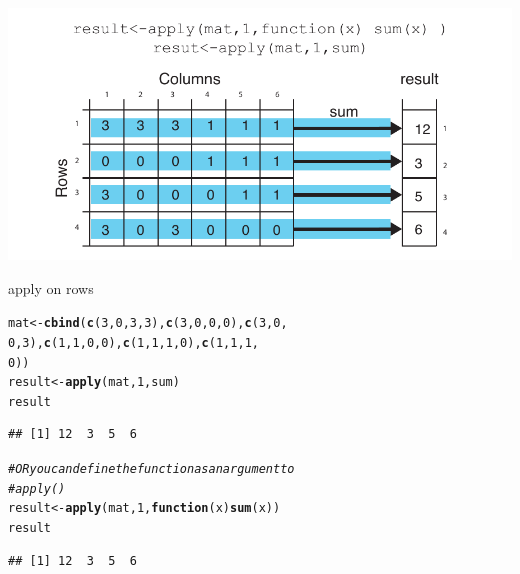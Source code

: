 \documentclass[english,nohyper]{tufte-book}\usepackage[]{graphicx}\usepackage[]{color}
\makeatletter
\newcommand{\hlnum}[1]{\textcolor[rgb]{0.686,0.059,0.569}{#1}}%
\newcommand{\hlcom}[1]{\textcolor[rgb]{0.678,0.584,0.686}{\textit{#1}}}%
\newcommand{\hlstd}[1]{\textcolor[rgb]{0.345,0.345,0.345}{#1}}%
\newcommand{\hlkwa}[1]{\textcolor[rgb]{0.161,0.373,0.58}{\textbf{#1}}}%
\newcommand{\hlkwb}[1]{\textcolor[rgb]{0.69,0.353,0.396}{#1}}%
\newcommand{\hlkwc}[1]{\textcolor[rgb]{0.333,0.667,0.333}{#1}}%
\newcommand{\hlkwd}[1]{\textcolor[rgb]{0.737,0.353,0.396}{\textbf{#1}}}%
\newenvironment{kframe}{%
 \def\at@end@of@kframe{}%
 \ifinner\ifhmode%
  \def\at@end@of@kframe{\end{minipage}}%
  \begin{minipage}{\columnwidth}%
 \fi\fi%
 \def\FrameCommand##1{\hskip\@totalleftmargin \hskip-\fboxsep
 \colorbox{shadecolor}{##1}\hskip-\fboxsep
     \hskip-\linewidth \hskip-\@totalleftmargin \hskip\columnwidth}%
 \MakeFramed {\advance\hsize-\width
   \@totalleftmargin\z@ \linewidth\hsize
   \@setminipage}}%
 {\par\unskip\endMakeFramed%
 \at@end@of@kframe}
\newenvironment{knitrout}{}{} %
\makeatother
\begin{document}
\begin{marginfigure}
\includegraphics[clip,scale=0.5]{1_Users_altuna_Dropbox_PAPERS_R-devel_compgenr_chapters_nonR_figures_apply.pdf}\caption{apply on rows\label{mar:apply-on-a-matrix}}


\end{marginfigure}


\begin{knitrout}
\color{fgcolor}\begin{kframe}
\begin{alltt}
\hlstd{mat} \hlkwb{<-} \hlkwd{cbind}\hlstd{(}\hlkwd{c}\hlstd{(}\hlnum{3}\hlstd{,} \hlnum{0}\hlstd{,} \hlnum{3}\hlstd{,} \hlnum{3}\hlstd{),} \hlkwd{c}\hlstd{(}\hlnum{3}\hlstd{,} \hlnum{0}\hlstd{,} \hlnum{0}\hlstd{,} \hlnum{0}\hlstd{),} \hlkwd{c}\hlstd{(}\hlnum{3}\hlstd{,} \hlnum{0}\hlstd{,}
    \hlnum{0}\hlstd{,} \hlnum{3}\hlstd{),} \hlkwd{c}\hlstd{(}\hlnum{1}\hlstd{,} \hlnum{1}\hlstd{,} \hlnum{0}\hlstd{,} \hlnum{0}\hlstd{),} \hlkwd{c}\hlstd{(}\hlnum{1}\hlstd{,} \hlnum{1}\hlstd{,} \hlnum{1}\hlstd{,} \hlnum{0}\hlstd{),} \hlkwd{c}\hlstd{(}\hlnum{1}\hlstd{,} \hlnum{1}\hlstd{,} \hlnum{1}\hlstd{,}
    \hlnum{0}\hlstd{))}
\hlstd{result} \hlkwb{<-} \hlkwd{apply}\hlstd{(mat,} \hlnum{1}\hlstd{, sum)}
\hlstd{result}
\end{alltt}
\begin{verbatim}
## [1] 12  3  5  6
\end{verbatim}
\begin{alltt}
\hlcom{# OR you can define the function as an argument to}
\hlcom{# apply()}
\hlstd{result} \hlkwb{<-} \hlkwd{apply}\hlstd{(mat,} \hlnum{1}\hlstd{,} \hlkwa{function}\hlstd{(}\hlkwc{x}\hlstd{)} \hlkwd{sum}\hlstd{(x))}
\hlstd{result}
\end{alltt}
\begin{verbatim}
## [1] 12  3  5  6
\end{verbatim}
\end{kframe}
\end{knitrout}
\end{document}
